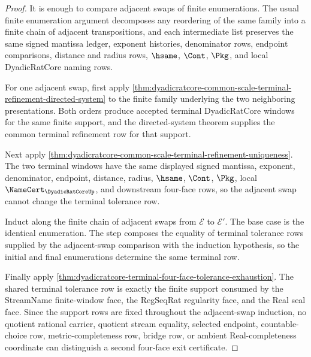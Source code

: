 \begin{proof}
It is enough to compare adjacent swaps of finite enumerations. The usual finite enumeration argument decomposes any reordering of the same family into a finite chain of adjacent transpositions, and each intermediate list preserves the same signed mantissa ledger, exponent histories, denominator rows, endpoint comparisons, distance and radius rows, $\hsame$, $\Cont$, $\Pkg$, and local DyadicRatCore naming rows.

For one adjacent swap, first apply \autoref{thm:dyadicratcore-common-scale-terminal-refinement-directed-system} to the finite family underlying the two neighboring presentations. Both orders produce accepted terminal DyadicRatCore windows for the same finite support, and the directed-system theorem supplies the common terminal refinement row for that support.

Next apply \autoref{thm:dyadicratcore-common-scale-terminal-refinement-uniqueness}. The two terminal windows have the same displayed signed mantissa, exponent, denominator, endpoint, distance, radius, $\hsame$, $\Cont$, $\Pkg$, local $\NameCert_{\DyadicRatCoreUp}$, and downstream four-face rows, so the adjacent swap cannot change the terminal tolerance row.

Induct along the finite chain of adjacent swaps from $\mathcal{E}$ to $\mathcal{E}'$. The base case is the identical enumeration. The step composes the equality of terminal tolerance rows supplied by the adjacent-swap comparison with the induction hypothesis, so the initial and final enumerations determine the same terminal row.

Finally apply \autoref{thm:dyadicratcore-terminal-four-face-tolerance-exhaustion}. The shared terminal tolerance row is exactly the finite support consumed by the StreamName finite-window face, the RegSeqRat regularity face, and the Real seal face. Since the support rows are fixed throughout the adjacent-swap induction, no quotient rational carrier, quotient stream equality, selected endpoint, countable-choice row, metric-completeness row, bridge row, or ambient Real-completeness coordinate can distinguish a second four-face exit certificate.
\end{proof}

